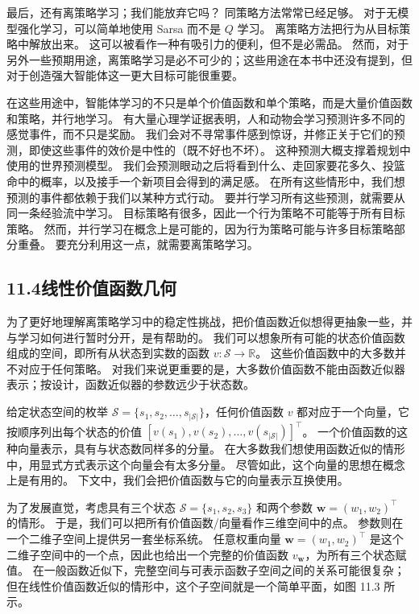 \documentclass[UTF8, 12pt, fontset=fandol, oneside]{ctexart}
\begin{document}
最后，还有离策略学习；我们能放弃它吗？
同策略方法常常已经足够。
对于无模型强化学习，可以简单地使用 Sarsa 而不是 $Q$ 学习。
离策略方法把行为从目标策略中解放出来。
这可以被看作一种有吸引力的便利，但不是必需品。
然而，对于另外一些预期用途，离策略学习是必不可少的；这些用途在本书中还没有提到，但对于创造强大智能体这一更大目标可能很重要。

在这些用途中，智能体学习的不只是单个价值函数和单个策略，而是大量价值函数和策略，并行地学习。
有大量心理学证据表明，人和动物会学习预测许多不同的感觉事件，而不只是奖励。
我们会对不寻常事件感到惊讶，并修正关于它们的预测，即使这些事件的效价是中性的（既不好也不坏）。
这种预测大概支撑着规划中使用的世界预测模型。
我们会预测眼动之后将看到什么、走回家要花多久、投篮命中的概率，以及接手一个新项目会得到的满足感。
在所有这些情形中，我们想预测的事件都依赖于我们以某种方式行动。
要并行学习所有这些预测，就需要从同一条经验流中学习。
目标策略有很多，因此一个行为策略不可能等于所有目标策略。
然而，并行学习在概念上是可能的，因为行为策略可能与许多目标策略部分重叠。
要充分利用这一点，就需要离策略学习。

\subsection*{11.4\quad 线性价值函数几何}

为了更好地理解离策略学习中的稳定性挑战，把价值函数近似想得更抽象一些，并与学习如何进行暂时分开，是有帮助的。
我们可以想象所有可能的状态价值函数组成的空间，即所有从状态到实数的函数 $v:\mathcal{S}\to\mathbb{R}$。
这些价值函数中的大多数并不对应于任何策略。
对我们来说更重要的是，大多数价值函数不能由函数近似器表示；按设计，函数近似器的参数远少于状态数。

给定状态空间的枚举 $\mathcal{S}=\{s_1,s_2,\ldots,s_{|\mathcal{S}|}\}$，任何价值函数 $v$ 都对应于一个向量，它按顺序列出每个状态的价值
$[v(s_1),v(s_2),\ldots,v(s_{|\mathcal{S}|})]^\top$。
一个价值函数的这种向量表示，具有与状态数同样多的分量。
在大多数我们想使用函数近似的情形中，用显式方式表示这个向量会有太多分量。
尽管如此，这个向量的思想在概念上是有用的。
下文中，我们会把价值函数与它的向量表示互换使用。

为了发展直觉，考虑具有三个状态 $\mathcal{S}=\{s_1,s_2,s_3\}$ 和两个参数 $\mathbf{w}=(w_1,w_2)^\top$ 的情形。
于是，我们可以把所有价值函数/向量看作三维空间中的点。
参数则在一个二维子空间上提供另一套坐标系统。
任意权重向量 $\mathbf{w}=(w_1,w_2)^\top$ 是这个二维子空间中的一个点，因此也给出一个完整的价值函数 $v_{\mathbf{w}}$，为所有三个状态赋值。
在一般函数近似下，完整空间与可表示函数子空间之间的关系可能很复杂；但在线性价值函数近似的情形中，这个子空间就是一个简单平面，如图 11.3 所示。
\end{document}
